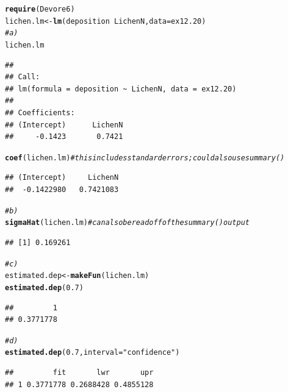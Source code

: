 \documentclass[twoside]{book}\usepackage[]{graphicx}\usepackage[]{xcolor}
\makeatletter
\newcommand{\hlnum}[1]{\textcolor[rgb]{0.686,0.059,0.569}{#1}}%
\newcommand{\hlstr}[1]{\textcolor[rgb]{0.192,0.494,0.8}{#1}}%
\newcommand{\hlcom}[1]{\textcolor[rgb]{0.678,0.584,0.686}{\textit{#1}}}%
\newcommand{\hlopt}[1]{\textcolor[rgb]{0,0,0}{#1}}%
\newcommand{\hlstd}[1]{\textcolor[rgb]{0.345,0.345,0.345}{#1}}%
\newcommand{\hlkwb}[1]{\textcolor[rgb]{0.69,0.353,0.396}{#1}}%
\newcommand{\hlkwc}[1]{\textcolor[rgb]{0.333,0.667,0.333}{#1}}%
\newcommand{\hlkwd}[1]{\textcolor[rgb]{0.737,0.353,0.396}{\textbf{#1}}}%
\newenvironment{kframe}{%
 \def\at@end@of@kframe{}%
 \ifinner\ifhmode%
  \def\at@end@of@kframe{\end{minipage}}%
  \begin{minipage}{\columnwidth}%
 \fi\fi%
 \def\FrameCommand##1{\hskip\@totalleftmargin \hskip-\fboxsep
 \colorbox{shadecolor}{##1}\hskip-\fboxsep
     \hskip-\linewidth \hskip-\@totalleftmargin \hskip\columnwidth}%
 \MakeFramed {\advance\hsize-\width
   \@totalleftmargin\z@ \linewidth\hsize
   \@setminipage}}%
 {\par\unskip\endMakeFramed%
 \at@end@of@kframe}
\newenvironment{knitrout}{}{} %
\makeatother
\begin{document}
\begin{solution}
\begin{knitrout}
\color{fgcolor}\begin{kframe}
\begin{alltt}
\hlkwd{require}\hlstd{(Devore6)}
\hlstd{lichen.lm} \hlkwb{<-} \hlkwd{lm}\hlstd{( deposition} \hlopt{~} \hlstd{LichenN,} \hlkwc{data}\hlstd{=ex12.20)}
\hlcom{# a)}
\hlstd{lichen.lm}
\end{alltt}
\begin{verbatim}
## 
## Call:
## lm(formula = deposition ~ LichenN, data = ex12.20)
## 
## Coefficients:
## (Intercept)      LichenN  
##     -0.1423       0.7421
\end{verbatim}
\begin{alltt}
\hlkwd{coef}\hlstd{(lichen.lm)}      \hlcom{# this includes standard errors; could also use summary() }
\end{alltt}
\begin{verbatim}
## (Intercept)     LichenN 
##  -0.1422980   0.7421083
\end{verbatim}
\begin{alltt}
\hlcom{# b)}
\hlkwd{sigmaHat}\hlstd{(lichen.lm)}  \hlcom{# can also be read off of the summary() output}
\end{alltt}
\begin{verbatim}
## [1] 0.169261
\end{verbatim}
\begin{alltt}
\hlcom{# c)}
\hlstd{estimated.dep} \hlkwb{<-} \hlkwd{makeFun}\hlstd{(lichen.lm)}
\hlkwd{estimated.dep}\hlstd{(}\hlnum{0.7}\hlstd{)}
\end{alltt}
\begin{verbatim}
##         1 
## 0.3771778
\end{verbatim}
\begin{alltt}
\hlcom{# d) }
\hlkwd{estimated.dep}\hlstd{(}\hlnum{0.7}\hlstd{,} \hlkwc{interval}\hlstd{=}\hlstr{"confidence"}\hlstd{)}
\end{alltt}
\begin{verbatim}
##         fit       lwr       upr
## 1 0.3771778 0.2688428 0.4855128
\end{verbatim}
\end{kframe}
\end{knitrout}
\end{solution}
\end{document}
